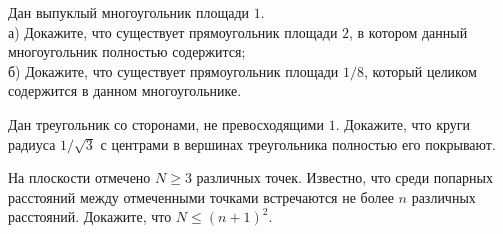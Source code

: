 \begin{problems}
\item Дан выпуклый многоугольник площади $1$. \\
а) Докажите, что существует прямоугольник площади $2$, в котором данный многоугольник полностью содержится; \\
б) Докажите, что существует прямоугольник площади $1/8$, который целиком содержится в данном многоугольнике.

\item Дан треугольник со сторонами, не превосходящими $1$. Докажите, что круги радиуса $1/\sqrt{3}$ с центрами в вершинах треугольника полностью его покрывают.

\item На плоскости отмечено $N \geqslant 3$ различных точек. Известно, что среди попарных расстояний между отмеченными точками встречаются не более $n$ различных расстояний. Докажите, что $N \leqslant (n + 1)^2$.


\end{problems}
